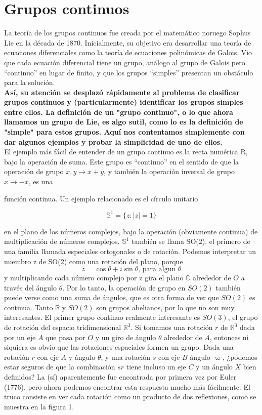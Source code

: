 \documentclass[11pt]{book}
\numberwithin{equation}{section}
\theoremstyle{plain}  %
\providecommand{\abs}[1]{\lvert#1\rvert} %
\begin{document}
\section{Grupos continuos}
La teoría de los grupos continuos fue creada por el matemático noruego Sophus Lie en la 
década de 1870. Inicialmente, su objetivo era desarrollar una teoría de ecuaciones
diferenciales como la teoría de ecuaciones polinómicas de Galois. Vio que cada 
ecuación diferencial tiene un grupo, análogo al grupo de Galois pero “continuo”
en lugar de finito, y que los grupos “simples” presentan un obstáculo para la 
solución. 
\\
\textbf{
Así, su atención se desplazó rápidamente al problema de clasificar 
grupos continuos y (particularmente) identificar los grupos simples entre ellos. 
La definición de un "grupo continuo", o lo que ahora llamamos un grupo de Lie, 
es algo sutil, como lo es la definición de "simple" para estos grupos. 
Aquí nos contentamos simplemente con dar algunos ejemplos y probar la simplicidad 
de uno de ellos.}
\\
El ejemplo más fácil de entender de un grupo continuo es la recta numérica R, bajo 
la operación de suma. Este grupo es “continuo” en el sentido de que la operación de grupo $x , y \to x+y$, y también la operación inversal de grupo $x \to -x$, es una 

función continua. Un ejemplo relacionado es el círculo unitario


\begin{equation*}
    \mathbb{S}^{1}=\{z : \abs{z}=1\}
\end{equation*}

en el plano de los números complejos, bajo la operación
(obviamente continua) de multiplicación de números complejos.
$\mathbb{S}^{1}$ también se llama SO(2), el primero de una familia llamada 
especiales ortogonales o de rotación. Podemos interpretar un 
miembro z de SO(2) como una rotación del plano, porque
\begin{equation*}
    z = \cos{\theta}+ i \sin{\theta}\text{, para algun } \theta
\end{equation*}
y multiplicando cada número complejo por z gira el plano $\mathbb{C}$
alrededor de $O$ a través del ángulo $\theta$. Por lo tanto, la operación
de grupo en $SO(2)$ también puede verse como una suma de ángulos,
que es otra forma de ver que $SO(2)$ es continua. Tanto $\mathbb{R}$ y
$SO(2)$ son grupos abelianos, por lo que no son muy interesantes. 
El primer grupo continuo realmente interesante es $SO(3)$, el
grupo de rotación del espacio tridimensional $\mathbb{R}^{3}$. Si tomamos
una rotación $r$ de $\mathbb{R}^{3}$ dada por un eje $A$ que pasa por $O$ y un
giro de ángulo $\theta$ alrededor de $A$, entonces ni siquiera es obvio
que las rotaciones espaciales formen un grupo. Dada una
rotación $r$ con eje $A$ y ángulo $\theta$, y una rotación $s$ con eje $B$ 
ángulo $\varpi$, ¿podemos estar seguros de que la combinación $sr$ tiene
incluso un eje $C$ y un ángulo $X$ bien definidos? La 
(sí) aparentemente fue encontrada por primera vez por Euler
(1776), pero ahora podemos encontrar esta respuesta mucho más
fácilmente. El truco consiste en ver cada rotación como un
producto de dos reflexiones, como se muestra en la figura 1.
\end{document}
